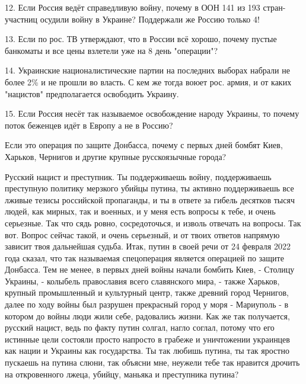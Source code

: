 12. Если Россия ведёт справедливую войну, почему в ООН 141 из 193
стран-участниц осудили войну в Украине? Поддержали же Россию только 4!

13. Если по рос. ТВ утверждают, что в России всё хорошо, почему пустые
банкоматы и все цены взлетели уже на 8 день "операции"?

14. Украинские националистические партии на последних выборах набрали не более
2\% и не прошли во власть. С кем же тогда воюет рос. армия, и от каких
"нацистов" предполагается освободить Украину.

15. Если Россия несёт так называемое освобождение народу Украины, то почему
поток беженцев идёт в Европу а не в Россию?


Если это операция по защите Донбасса, почему с первых дней бомбят Киев,
Харьков, Чернигов и другие крупные русскоязычные города?

Русский нацист и преступник. Ты поддерживаешь войну, поддерживаешь преступную
политику мерзкого убийцы путина, ты активно поддерживаешь все лживые тезисы
российской пропаганды, и ты в ответе за гибель десятков тысяч людей, как
мирных, так и военных, и у меня есть вопросы к тебе, и очень серьезные. Так что
сядь ровно, сосредоточься, и изволь отвечать на вопросы.  Так вот. Вопрос
сейчас такой, и очень серьезный, и от твоих ответов напрямую зависит твоя
дальнейшая судьба. Итак, путин в своей речи от 24 февраля 2022 года сказал, что
так называемая спецоперация является операцией по защите Донбасса. Тем не
менее, в первых дней войны начали бомбить Киев, - Столицу Украины, - колыбель
православия всего славянского мира, - также Харьков, крупный промышленный и
культурный центр, также древний город Чернигов, далее по ходу войны был
разрушен прекрасный город у моря - Мариуполь - в котором до войны люди жили
себе, радовались жизни. Как же так получается, русский нацист, ведь по факту
путин солгал, нагло соглал, потому что его истинные цели состояли просто
напросто в грабеже и уничтожении украинцев как нации и Украины как государства.
Ты так любишь путина, ты так яростно пускаешь на путина слюни, так объясни мне,
неужели тебе так нравится дрочить на откровенного лжеца, убийцу, маньяка и
преступника путина?

